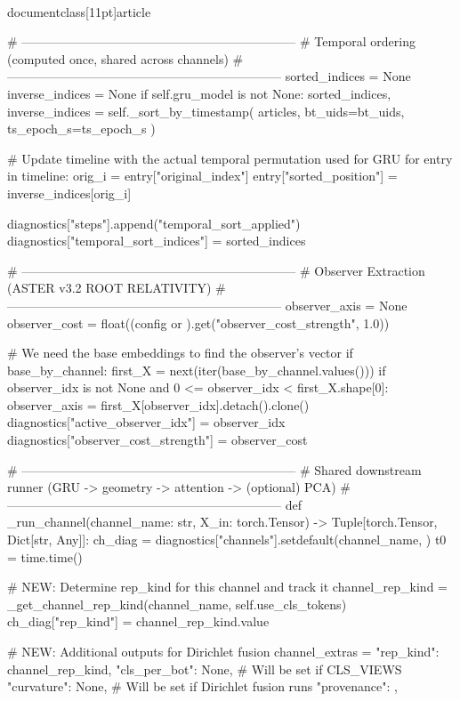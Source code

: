 \\documentclass[11pt]{article}
\begin{document}
\begin{CodeBlock}
        # ------------------------------------------------------------------
        # Temporal ordering (computed once, shared across channels)
        # ------------------------------------------------------------------
        sorted_indices = None
        inverse_indices = None
        if self.gru_model is not None:
            sorted_indices, inverse_indices = self._sort_by_timestamp(
                articles, bt_uids=bt_uids, ts_epoch_s=ts_epoch_s
            )

            # Update timeline with the actual temporal permutation used for GRU
            for entry in timeline:
                orig_i = entry["original_index"]
                entry["sorted_position"] = inverse_indices[orig_i]

            diagnostics["steps"].append("temporal_sort_applied")
            diagnostics["temporal_sort_indices"] = sorted_indices

        # ------------------------------------------------------------------
        # Observer Extraction (ASTER v3.2 ROOT RELATIVITY)
        # ------------------------------------------------------------------
        observer_axis = None
        observer_cost = float((config or {}).get("observer_cost_strength", 1.0))
        
        # We need the base embeddings to find the observer's vector
        if base_by_channel:
            first_X = next(iter(base_by_channel.values()))
            if observer_idx is not None and 0 <= observer_idx < first_X.shape[0]:
                observer_axis = first_X[observer_idx].detach().clone()
                diagnostics["active_observer_idx"] = observer_idx
                diagnostics["observer_cost_strength"] = observer_cost

        # ------------------------------------------------------------------
        # Shared downstream runner (GRU -> geometry -> attention -> (optional) PCA)
        # ------------------------------------------------------------------
        def _run_channel(channel_name: str, X_in: torch.Tensor) -> Tuple[torch.Tensor, Dict[str, Any]]:
            ch_diag = diagnostics["channels"].setdefault(channel_name, {})
            t0 = time.time()
            
            # NEW: Determine rep_kind for this channel and track it
            channel_rep_kind = _get_channel_rep_kind(channel_name, self.use_cls_tokens)
            ch_diag["rep_kind"] = channel_rep_kind.value
            
            # NEW: Additional outputs for Dirichlet fusion
            channel_extras = {
                "rep_kind": channel_rep_kind,
                "cls_per_bot": None,  # Will be set if CLS_VIEWS
                "curvature": None,    # Will be set if Dirichlet fusion runs
                "provenance": {},
            }


\end{CodeBlock}
\end{document}
